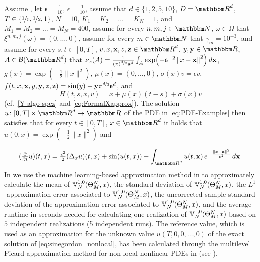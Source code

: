 Assume ,
let 
$\mathfrak{s} = \tfrac{1}{10}$,
$\epsilon =\tfrac{1}{10}$,
assume that
$d\in\{1,2,5,10\}$,
$\D = \R^d$,
$T\in\{\nicefrac{1}{5},\nicefrac{1}{2},1\}$,
$N=10$,
$K_1 = K_2 = \ldots = K_N= 1$, and
$M_1 = M_2 = \ldots = M_N = 400$,
assume for every 
$n,m,j\in \N$, $\omega \in \Omega$
that 
$\xi^{n,m,j}(\omega)=(0,\dots,0)$,
assume for every 
$m \in \N$
that
$\gamma_m = 10^{-3}$,
and
assume for every 
$s,t \in [0,T]$, 
$v,x,{\textbf x},z, {\textbf z} \in \R^d$, 
$y,{\textbf y} \in \R$,
$A \in \mathcal{B}(\R^d)$
that
$\nu_x(A) = \frac{1}{(\pi)^{\nicefrac{d}{2}}\mathfrak{s}^d}\int_A \exp\!\left(-\mathfrak{s}^{-2}\left\| x - {\textbf x} \right\|^2\right)d{\textbf x}$,
$g(x)= \exp (-\tfrac{1}{2}\|x\|^2)$,
$\mu(x)=(0,\dots,0)$,
$\sigma(x) v = \epsilon v$, 
$f(t,x,{\textbf x},y,{\textbf y}, z, {\textbf z})=  \sin(y) - {\textbf y} \pi^{\nicefrac{d}{2}}\mathfrak{s}^d$, and
\begin{equation}
	H(t,s,x,v)=x + \mu(x)(t-s)+ \sigma(x)v
\end{equation}
(cf.\ \eqref{Y-algo-spez} and \eqref{eq:FormalXapprox}).
The solution $u\colon[0,T]\times \R^d \to \R$ of the PDE in \eqref{eq:PDE-Examples} then satisfies that for every
$t\in [0,T]$, $x\in\R^d$ it holds that $u(0,x)=\exp (-\tfrac{1}{2}\|x\|^2)$ and

\begin{equation}
 (\tfrac{\partial}{\partial t}u)(t,x)
 =
 \tfrac{\epsilon^2}{2}(\Delta_x u)(t,x) + \sin ( u(t,x) ) - \int_{\R^d} u(t,{\textbf x})\, e^{-\frac{\norm{x-{\textbf x}}^2}{\mathfrak{s}^2}}\,d{\textbf x} .
 \label{eq:sinegordon_nonlocal}
\end{equation}
%
%
In  
we use the machine learning-based approximation method
in  
to approximately calculate
the mean of %
$
{\mathbb{V}}^{1,0}_N(\Theta^N_M,x)
$,
the standard deviation of %
$
{\mathbb{V}}^{1,0}_N(\Theta^N_M,x)
$,
the $ L^1 $-approximation error associated to %
$
{\mathbb{V}}^{1,0}_N(\Theta^N_M,x)
$,
the uncorrected sample standard deviation of the approximation error associated to %
$
{\mathbb{V}}^{1,0}_N(\Theta^N_M,x)
$,
and the average runtime in seconds needed for calculating one realization of $
{\mathbb{V}}^{1,0}_N(\Theta^N_M,x)
$
%
based on $5$ independent realizations (5 independent runs).
%
The reference value, which is used as an approximation for the unknown value $u(T,0,0,\ldots,0)$ of the exact solution of \eqref{eq:sinegordon_nonlocal},  has been calculated through the multilevel Picard approximation method for non-local nonlinear PDEs in  (see ).

